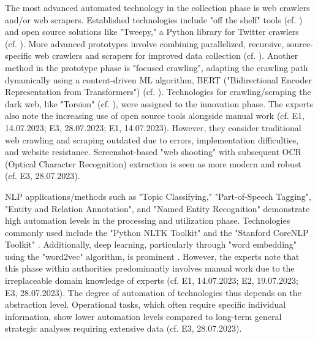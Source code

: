 \documentclass[10pt]{article}
\begin{document}
The most advanced automated technology in the collection phase is web crawlers and/or web scrapers.
Established technologies include "off the shelf" tools (cf. \cite{Middleton.2020}) and open source
solutions like "Tweepy," a Python library for Twitter crawlers (cf. \cite{Adewopo.2020,Tekin.2021}).
More advanced prototypes involve combining parallelized, recursive, source-specific web crawlers and scrapers for improved
data collection (cf. \cite{Jenkins.2021,Rajendran.2022}). Another method in the prototype phase is
"focused crawling", adapting the crawling path dynamically using a content-driven ML algorithm, BERT ("Bidirectional Encoder Representation from Transformers")
(cf. \cite{Kuehn.2023}). Technologies for crawling/scraping the dark web, like "Torsion" (cf. \cite{Sonawane.2022}),
were assigned to the innovation phase. The experts also note the increasing use of open source tools alongside manual work
(cf. E1, 14.07.2023; E3, 28.07.2023; E1, 14.07.2023). However, they consider traditional web crawling and scraping
outdated due to errors, implementation difficulties, and website resistance. Screenshot-based "web shooting" with
subsequent OCR (Optical Character Recognition) extraction is seen as more modern and robust (cf. E3, 28.07.2023).

NLP applications/methods such as "Topic Classifying," "Part-of-Speech Tagging", "Entity and Relation Annotation", and "Named Entity Recognition"
demonstrate high automation levels in the processing and utilization phase. Technologies commonly used include
the "Python NLTK Toolkit" \cite{Hubbard.2022} and the "Stanford CoreNLP Toolkit" \cite{Middleton.2020}.
Additionally, deep learning, particularly through "word embedding" using the "word2vec" algorithm, is prominent
\cite{Bai.2020,Pingle.2020,Shen.2020}. However, the experts note that
this phase within authorities predominantly involves manual work due to the irreplaceable domain knowledge of experts
(cf. E1, 14.07.2023; E2, 19.07.2023; E3, 28.07.2023). The degree of automation of technologies thus depends on the abstraction level.
Operational tasks, which often require specific individual information, show lower automation levels compared to long-term general strategic analyses
requiring extensive data (cf. E3, 28.07.2023).
\end{document}
